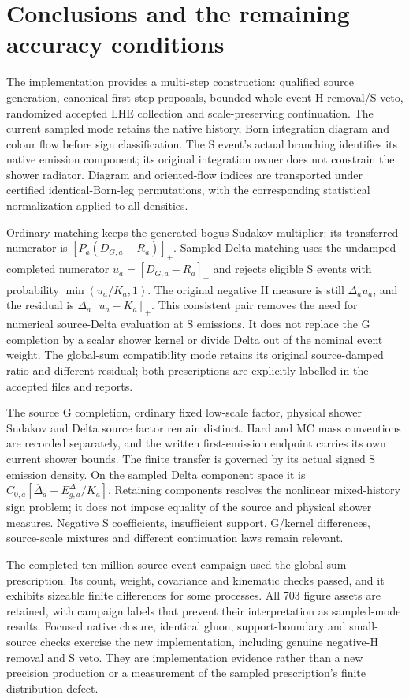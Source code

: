 \section{Conclusions and the remaining accuracy conditions}
\label{sec:conclusions}
The implementation provides a multi-step construction: qualified source
generation, canonical first-step proposals, bounded whole-event H
removal/S veto, randomized accepted LHE collection and scale-preserving
continuation. The current sampled mode retains the native history,
Born integration diagram and colour flow before sign classification.
The S event's actual branching identifies its native emission component;
its original integration owner does not constrain the shower radiator.
Diagram and oriented-flow indices are transported under certified
identical-Born-leg permutations, with the corresponding statistical
normalization applied to all densities.

Ordinary matching keeps the generated bogus-Sudakov multiplier:
its transferred numerator is $[P_a(D_{G,a}-R_a)]_+$. Sampled Delta
matching uses the undamped completed numerator $u_a=[D_{G,a}-R_a]_+$
and rejects eligible S events with probability
$\min(u_a/K_a,1)$. The original negative H measure is still
$\Delta_a u_a$, and the residual is $\Delta_a[u_a-K_a]_+$.
This consistent pair removes the need for numerical source-Delta
evaluation at S emissions. It does not replace the G completion by a
scalar shower kernel or divide Delta out of the nominal event weight.
The global-sum compatibility mode retains its original source-damped
ratio and different residual; both prescriptions are explicitly labelled
in the accepted files and reports.

The source G completion, ordinary fixed low-scale factor, physical
shower Sudakov and Delta source factor remain distinct. Hard and MC
mass conventions are recorded separately, and the written first-emission
endpoint carries its own current shower bounds. The finite transfer is
governed by its actual signed S emission density. On the sampled Delta
component space it is
$C_{0,a}[\overline\Delta_a-E_{g,a}^{\Delta}/K_a]$.
Retaining components resolves the nonlinear mixed-history sign problem;
it does not impose equality of the source and physical shower measures.
Negative S coefficients, insufficient support, G/kernel differences,
source-scale mixtures and different continuation laws remain relevant.

The completed ten-million-source-event campaign used the global-sum
prescription. Its count, weight, covariance and kinematic checks passed,
and it exhibits sizeable finite differences for some processes. All
703 figure assets are retained, with campaign labels that prevent their
interpretation as sampled-mode results. Focused native closure, identical
gluon, support-boundary and small-source checks exercise the new
implementation, including genuine negative-H removal and S veto. They
are implementation evidence rather than a new precision production or
a measurement of the sampled prescription's finite distribution defect.

